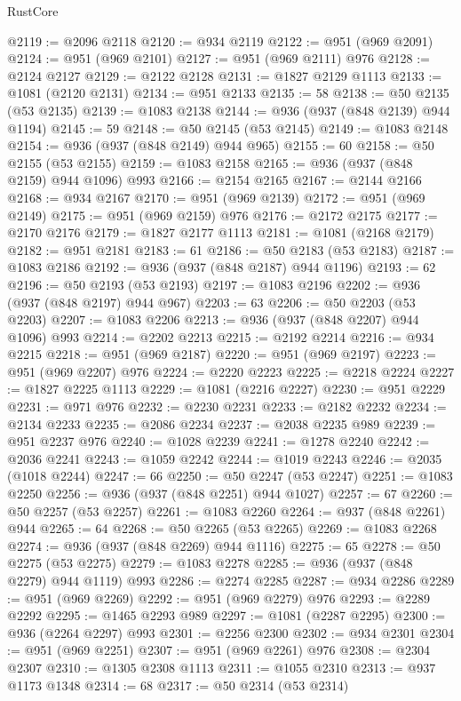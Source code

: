 \begin{lexlean}{RustCore}
\begin{coremodule}
@2119 := @2096 @2118
@2120 := @934 @2119
@2122 := @951 (@969 @2091)
@2124 := @951 (@969 @2101)
@2127 := @951 (@969 @2111) @976
@2128 := @2124 @2127
@2129 := @2122 @2128
@2131 := @1827 @2129 @1113
@2133 := @1081 (@2120 @2131)
@2134 := @951 @2133
@2135 := 58
@2138 := @50 @2135 (@53 @2135)
@2139 := @1083 @2138
@2144 := @936 (@937 (@848 @2139) @944 @1194)
@2145 := 59
@2148 := @50 @2145 (@53 @2145)
@2149 := @1083 @2148
@2154 := @936 (@937 (@848 @2149) @944 @965)
@2155 := 60
@2158 := @50 @2155 (@53 @2155)
@2159 := @1083 @2158
@2165 := @936 (@937 (@848 @2159) @944 @1096) @993
@2166 := @2154 @2165
@2167 := @2144 @2166
@2168 := @934 @2167
@2170 := @951 (@969 @2139)
@2172 := @951 (@969 @2149)
@2175 := @951 (@969 @2159) @976
@2176 := @2172 @2175
@2177 := @2170 @2176
@2179 := @1827 @2177 @1113
@2181 := @1081 (@2168 @2179)
@2182 := @951 @2181
@2183 := 61
@2186 := @50 @2183 (@53 @2183)
@2187 := @1083 @2186
@2192 := @936 (@937 (@848 @2187) @944 @1196)
@2193 := 62
@2196 := @50 @2193 (@53 @2193)
@2197 := @1083 @2196
@2202 := @936 (@937 (@848 @2197) @944 @967)
@2203 := 63
@2206 := @50 @2203 (@53 @2203)
@2207 := @1083 @2206
@2213 := @936 (@937 (@848 @2207) @944 @1096) @993
@2214 := @2202 @2213
@2215 := @2192 @2214
@2216 := @934 @2215
@2218 := @951 (@969 @2187)
@2220 := @951 (@969 @2197)
@2223 := @951 (@969 @2207) @976
@2224 := @2220 @2223
@2225 := @2218 @2224
@2227 := @1827 @2225 @1113
@2229 := @1081 (@2216 @2227)
@2230 := @951 @2229
@2231 := @971 @976
@2232 := @2230 @2231
@2233 := @2182 @2232
@2234 := @2134 @2233
@2235 := @2086 @2234
@2237 := @2038 @2235 @989
@2239 := @951 @2237 @976
@2240 := @1028 @2239
@2241 := @1278 @2240
@2242 := @2036 @2241
@2243 := @1059 @2242
@2244 := @1019 @2243
@2246 := @2035 (@1018 @2244)
@2247 := 66
@2250 := @50 @2247 (@53 @2247)
@2251 := @1083 @2250
@2256 := @936 (@937 (@848 @2251) @944 @1027)
@2257 := 67
@2260 := @50 @2257 (@53 @2257)
@2261 := @1083 @2260
@2264 := @937 (@848 @2261) @944
@2265 := 64
@2268 := @50 @2265 (@53 @2265)
@2269 := @1083 @2268
@2274 := @936 (@937 (@848 @2269) @944 @1116)
@2275 := 65
@2278 := @50 @2275 (@53 @2275)
@2279 := @1083 @2278
@2285 := @936 (@937 (@848 @2279) @944 @1119) @993
@2286 := @2274 @2285
@2287 := @934 @2286
@2289 := @951 (@969 @2269)
@2292 := @951 (@969 @2279) @976
@2293 := @2289 @2292
@2295 := @1465 @2293 @989
@2297 := @1081 (@2287 @2295)
@2300 := @936 (@2264 @2297) @993
@2301 := @2256 @2300
@2302 := @934 @2301
@2304 := @951 (@969 @2251)
@2307 := @951 (@969 @2261) @976
@2308 := @2304 @2307
@2310 := @1305 @2308 @1113
@2311 := @1055 @2310
@2313 := @937 @1173 @1348
@2314 := 68
@2317 := @50 @2314 (@53 @2314)

\end{coremodule}
\end{lexlean}
